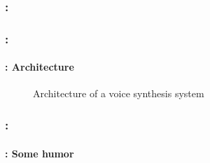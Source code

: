 \documentclass[xcolor=table]{beamer}
\begin{document}
\begin{frame}
	\frametitle{\insertshortsubtitle: \insertsection}
	\framesubtitle{\insertsubsection}
	
	
\end{frame}

\begin{frame}
	\frametitle{\insertshortsubtitle: \insertsection}
	\framesubtitle{\insertsubsection: Architecture}
	
	\begin{figure}
		\centering
		\caption{Architecture of a voice synthesis system \cite{2017-Hinterleitner}}
	\end{figure}

\end{frame}


\begin{frame}
	\frametitle{\insertshortsubtitle: \insertsection}
	\framesubtitle{\insertsubsection: Some humor}
	
	\begin{center}
	\end{center}

\end{frame}


\end{document}
